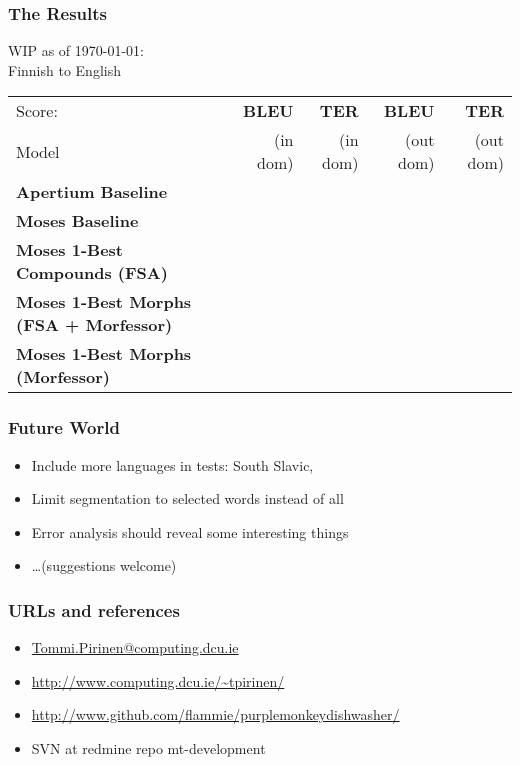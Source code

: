 \documentclass{beamer}
\begin{document}
\begin{frame}
    \frametitle{The Results}
    \begin{tiny}
    WIP as of \today: \\
    Finnish to English\\
        \begin{tabular}{|l|r|r||r|r|}
            \hline
            Score: & \bf BLEU & \bf TER  & \bf BLEU  & \bf TER   \\
            Model  & (in dom) & (in dom) & (out dom) & (out dom) \\ 
            \hline
            \bf Apertium Baseline      & & & &  \\
            \hline
            \bf Moses Baseline         & & & &  \\
            \hline
            \bf Moses 1-Best Compounds (FSA) & & & &  \\
            \hline
            \bf Moses 1-Best Morphs (FSA + Morfessor) & & & & \\
            \hline
            \bf Moses 1-Best Morphs (Morfessor) & & & &  \\
            \hline
        \end{tabular}
    \end{tiny}
\end{frame}
\begin{frame}
    \frametitle{Future World}
    \begin{itemize}
        \item Include more languages in tests: South Slavic, 
        \item Limit segmentation to selected words instead of all
        \item Error analysis should reveal some interesting things
        \item \ldots (suggestions welcome)
    \end{itemize}
\end{frame}

\begin{frame}
    \frametitle{URLs and references}
    \begin{itemize}
        \item \url{Tommi.Pirinen@computing.dcu.ie}
        \item \url{http://www.computing.dcu.ie/~tpirinen/} 
        \item \url{http://www.github.com/flammie/purplemonkeydishwasher/}
        \item SVN at redmine repo mt-development
    \end{itemize}
\end{frame}


\end{document}
